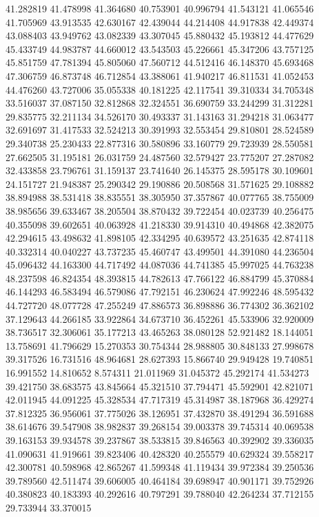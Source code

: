 41.282819
41.478998
41.364680
40.753901
40.996794
41.543121
41.065546
41.705969
43.913535
42.630167
42.439044
44.214408
44.917838
42.449374
43.088403
43.949762
43.082339
43.307045
45.880432
45.193812
44.477629
45.433749
44.983787
44.660012
43.543503
45.226661
45.347206
43.757125
45.851759
47.781394
45.805060
47.560712
44.512416
46.148370
45.693468
47.306759
46.873748
46.712854
43.388061
41.940217
46.811531
41.052453
44.476260
43.727006
35.055338
40.181225
42.117541
39.310334
34.705348
33.516037
37.087150
32.812868
32.324551
36.690759
33.244299
31.312281
29.835775
32.211134
34.526170
30.493337
31.143163
31.294218
31.063477
32.691697
31.417533
32.524213
30.391993
32.553454
29.810801
28.524589
29.340738
25.230433
22.877316
30.580896
33.160779
29.723939
28.550581
27.662505
31.195181
26.031759
24.487560
32.579427
23.775207
27.287082
32.433858
23.796761
31.159137
23.741640
26.145375
28.595178
30.109601
24.151727
21.948387
25.290342
29.190886
20.508568
31.571625
29.108882
38.894988
38.531418
38.835551
38.305950
37.357867
40.077765
38.755009
38.985656
39.633467
38.205504
38.870432
39.722454
40.023739
40.256475
40.355098
39.602651
40.063928
41.218330
39.914310
40.494868
42.382075
42.294615
43.498632
41.898105
42.334295
40.639572
43.251635
42.874118
40.332314
40.040227
43.737235
45.460747
43.499501
44.391080
44.236504
45.096432
44.163300
44.717492
44.087036
44.741385
45.997025
44.763238
48.237598
46.824354
48.393815
44.782613
47.766122
46.884799
45.370884
46.144293
46.583494
46.579086
47.792151
46.230624
47.992246
48.595432
44.727720
48.077728
47.255249
47.886573
36.898886
36.774302
36.362102
37.129643
44.266185
33.922864
34.673710
36.452261
45.533906
32.920009
38.736517
32.306061
35.177213
43.465263
38.080128
52.921482
18.144051
13.758691
41.796629
15.270353
30.754344
28.988805
30.848133
27.998678
39.317526
16.731516
48.964681
28.627393
15.866740
29.949428
19.740851
16.991552
14.810652
8.574311
21.011969
31.045372
45.292174
41.534273
39.421750
38.683575
43.845664
45.321510
37.794471
45.592901
42.821071
42.011945
44.091225
45.328534
47.717319
45.314987
38.187968
36.429274
37.812325
36.956061
37.775026
38.126951
37.432870
38.491294
36.591688
38.614676
39.547908
38.982837
39.268154
39.003378
39.745314
40.069538
39.163153
39.934578
39.237867
38.533815
39.846563
40.392902
39.336035
41.090631
41.919661
39.823406
40.428320
40.255579
40.629324
39.558217
42.300781
40.598968
42.865267
41.599348
41.119434
39.972384
39.250536
39.789560
42.511474
39.606005
40.464184
39.698947
40.901171
39.752926
40.380823
40.183393
40.292616
40.797291
39.788040
42.264234
37.712155
29.733944
33.370015
